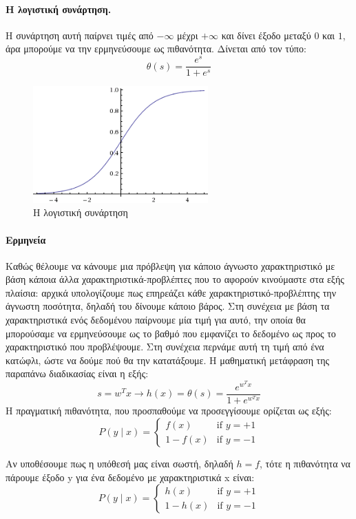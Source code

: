 \documentclass{article}
\begin{document}
\paragraph{Η λογιστική συνάρτηση.} Η συνάρτηση αυτή παίρνει τιμές από $- \infty$ μέχρι $+ \infty$ και δίνει έξοδο μεταξύ $0$ και $1$, άρα μπορούμε να την ερμηνεύσουμε ως πιθανότητα. Δίνεται από τον τύπο:
$$\theta(s)=\frac{e^s}{1 + e^s}$$
\begin{figure}[H]
	\centering			
    \includegraphics[width=0.6\textwidth]{logistic.png}
    \caption[Η λογιστική συνάρτηση]{Η λογιστική συνάρτηση}
 \end{figure}
 
 \paragraph{Ερμηνεία} Καθώς θέλουμε να κάνουμε μια πρόβλεψη για κάποιο άγνωστο χαρακτηριστικό με βάση κάποια άλλα χαρακτηριστικά-προβλέπτες που το αφορούν κινούμαστε στα εξής πλαίσια: αρχικά υπολογίζουμε πως επηρεάζει κάθε χαρακτηριστικό-προβλέπτης την άγνωστη ποσότητα, δηλαδή του δίνουμε κάποιο βάρος. Στη συνέχεια με βάση τα χαρακτηριστικά ενός δεδομένου παίρνουμε μία τιμή
για αυτό, την οποία θα μπορούσαμε να ερμηνεύσουμε ως το βαθμό που εμφανίζει το δεδομένο ως προς το χαρακτηριστικό που προβλέψουμε. Στη συνέχεια περνάμε αυτή τη τιμή  από ένα κατώφλι, ώστε να δούμε πού θα την κατατάξουμε. Η μαθηματική μετάφραση της παραπάνω διαδικασίας είναι η εξής:
$$s=w^T x \rightarrow h(x)=\theta(s)=\frac{e^{w^T x}}{1 + e^{w^T x} }$$
Η πραγματική πιθανότητα, που προσπαθούμε να προσεγγίσουμε  ορίζεται ως εξής:
$$P(y \mid x)=\left\{
	\begin{array}{ll}
		f(x)  & \mbox{if } y = +1 \\
		1 - f(x)  & \mbox{if } y = -1
	\end{array}
\right.$$

Αν υποθέσουμε πως η υπόθεσή μας είναι σωστή, δηλαδή $h=f$, τότε η πιθανότητα να πάρουμε έξοδο y για ένα δεδομένο με χαρακτηριστικά x είναι:
$$P(y \mid x)=\left\{
	\begin{array}{ll}
		h(x)  & \mbox{if } y = +1 \\
		1 - h(x)  & \mbox{if } y = -1
	\end{array}
\right.$$
 
\end{document}
